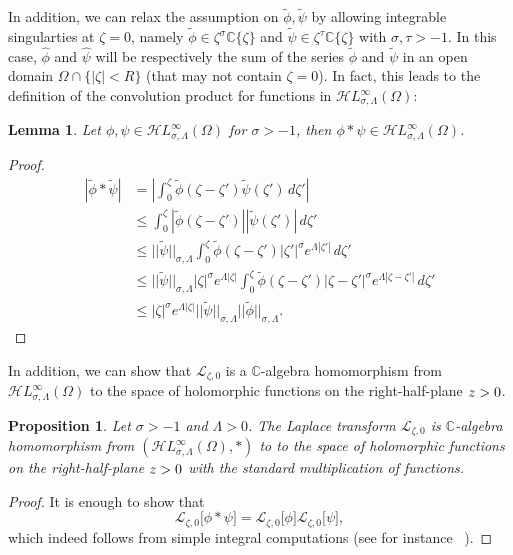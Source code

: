 \documentclass{article}
\let\Re\relax
\DeclareMathOperator{\Re}{Re}
\newcommand{\singexp}[2]{\mathcal{H}L^\infty_{#1, #2}}
\newcommand{\C}{\mathbb{C}}
\newcommand{\series}[1]{\tilde{#1}}
\newcommand{\laplace}{\mathcal{L}}
\theoremstyle{definition}
\theoremstyle{plain}
\newtheorem{prop}[definition]{Proposition}
\newtheorem{lemma}[definition]{Lemma}
\newenvironment{verify}{\color{ForestGreen}}{\color{black}}
\begin{document}
In addition, we can relax the assumption on $\series{\phi},\series{\psi}$ by allowing integrable singularties at $\zeta=0$, namely  $\series{\phi}\in\zeta^{\sigma}\C\lbrace\zeta\rbrace$ and $\series{\psi}\in\zeta^{\tau}\C\lbrace\zeta\rbrace$ with $\sigma,\tau>-1$. In this case, $\hat{\phi}$ and $\hat{\psi}$ will be respectively the sum of the series $\series{\phi}$ and $\series{\psi}$ in an open domain $\Omega\cap \lbrace |\zeta|<R\rbrace$ (that may not contain $\zeta=0$). In fact, this leads to the definition of the convolution product for functions in $\singexp{\sigma}{\Lambda}(\Omega)$: 
\begin{lemma}
    Let $\phi,\psi\in\singexp{\sigma}{\Lambda}(\Omega)$ for $\sigma>-1$, then $\phi\ast\psi\in\singexp{\sigma}{\Lambda}(\Omega)$.
\end{lemma}
\begin{verify}
\begin{proof}
    \begin{align*}
        | \tilde{\phi}\ast\tilde{\psi}|&=\left|\int_0^\zeta\tilde{\phi}(\zeta-\zeta')\tilde{\psi}(\zeta')\, d\zeta'\right|\\
        &\le \int_0^\zeta |\tilde{\phi}(\zeta-\zeta')||\tilde{\psi}(\zeta')|\, d\zeta'\\
        &\le ||\tilde{\psi}||_{\sigma,\Lambda} \int_0^\zeta\tilde{\phi}(\zeta-\zeta')|\zeta'|^{\sigma}e^{\Lambda|\zeta'|}\, d\zeta'\\
        &\le ||\tilde{\psi}||_{\sigma,\Lambda} |\zeta|^{\sigma}e^{\Lambda|\zeta|} \int_0^\zeta\tilde{\phi}(\zeta-\zeta')|\zeta-\zeta'|^{\sigma}e^{\Lambda|\zeta-\zeta'|}\, d\zeta'\\
        &\le |\zeta|^{\sigma}e^{\Lambda|\zeta|} ||\tilde{\psi}||_{\sigma,\Lambda} ||\tilde{\phi}||_{\sigma,\Lambda}. 
    \end{align*}
\end{proof}
\end{verify}
In addition, we can show that $\laplace_{\zeta,0}$ is a $\C$-algebra homomorphism from $\singexp{\sigma}{\Lambda}(\Omega)$ to the space of holomorphic functions on the right-half-plane $\Re z>0$. 
\begin{prop}
    Let $\sigma>-1$ and $\Lambda>0$. The Laplace transform $\laplace_{\zeta,0}$ is $\C$-algebra homomorphism from $(\singexp{\sigma}{\Lambda}(\Omega),\ast)$ to to the space of holomorphic functions on the right-half-plane $\Re z>0$ with the standard multiplication of functions. 
\end{prop}
\begin{proof}
It is enough to show that
\[\laplace_{\zeta,0}\big[{\phi}\ast{\psi}\big]=\laplace_{\zeta,0}\big[{\phi}\big]\laplace_{\zeta,0}\big[{\psi}\big],\]
which indeed follows from simple integral computations (see for instance ~\cite[Theorem 2.39]{laplace-tfm}). 
\end{proof}
\end{document}
